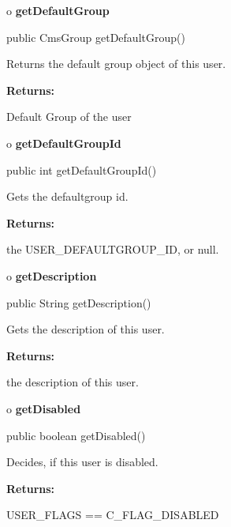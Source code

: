 o {\bf getDefaultGroup} 

\begin{PRE}
 public CmsGroup getDefaultGroup()
\end{PRE}

\begin{description}
\htmlDD Returns the default group object of this user. 

\begin{description}
\item {\bf Returns:}  

Default Group of the user  
\end{description}

\end{description}

o {\bf getDefaultGroupId} 

\begin{PRE}
 public int getDefaultGroupId()
\end{PRE}

\begin{description}
\htmlDD Gets the defaultgroup id. 

\begin{description}
\item {\bf Returns:}  

the USER\_DEFAULTGROUP\_ID, or null.  
\end{description}

\end{description}

o {\bf getDescription} 

\begin{PRE}
 public String getDescription()
\end{PRE}

\begin{description}
\htmlDD Gets the description of this user. 

\begin{description}
\item {\bf Returns:}  

the description of this user.  
\end{description}

\end{description}

o {\bf getDisabled} 

\begin{PRE}
 public boolean getDisabled()
\end{PRE}

\begin{description}
\htmlDD Decides, if this user is disabled. 

\begin{description}
\item {\bf Returns:}  

USER\_FLAGS == C\_FLAG\_DISABLED  
\end{description}

\end{description}


